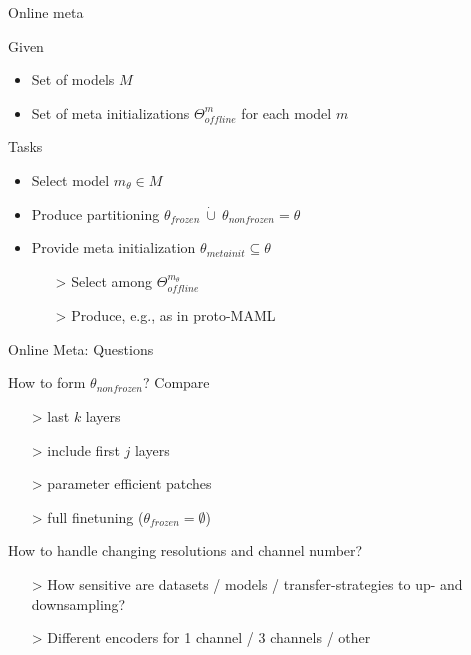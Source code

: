 \documentclass[aspectratio=169,12pt,handout]{beamer}
\begin{document}
\begin{frame}{Online meta}

\begin{block}{Given}
    \begin{itemize}
        \item Set of models $M$
        \item Set of meta initializations $\Theta_{offline}^m$ for each model $m$
    \end{itemize}
\end{block}

\begin{block}{Tasks}
    \begin{itemize}
        \item Select model $m_\theta \in M$
        \item Produce partitioning $\theta_{frozen} \ \dot{\cup} \ \theta_{nonfrozen} = \theta$
        \item Provide meta initialization $\theta_{metainit} \subseteq  \theta$
        \begin{itemize}
            \item[>] Select among $\Theta_{offline}^{m_\theta}$
            \item[>] Produce, e.g., as in proto-MAML
        \end{itemize}
    \end{itemize}
\end{block}

\end{frame}


\begin{frame}{Online Meta: Questions}


\begin{itemizebig}
    \item How to form $\theta_{nonfrozen}$? Compare
    \begin{itemize}
        \item[>] last $k$ layers
        \item[>] include first $j$ layers
        \item[>] parameter efficient patches
        \item[>] full finetuning ($\theta_{frozen} = \emptyset$)
    \end{itemize}

    \item How to handle changing resolutions and channel number?
    \begin{itemize}
        \item[>] How sensitive are datasets / models / transfer-strategies to up- and downsampling?
        \item[>] Different encoders for 1 channel / 3 channels / other
    \end{itemize}
\end{itemizebig}

\end{frame}
\end{document}
